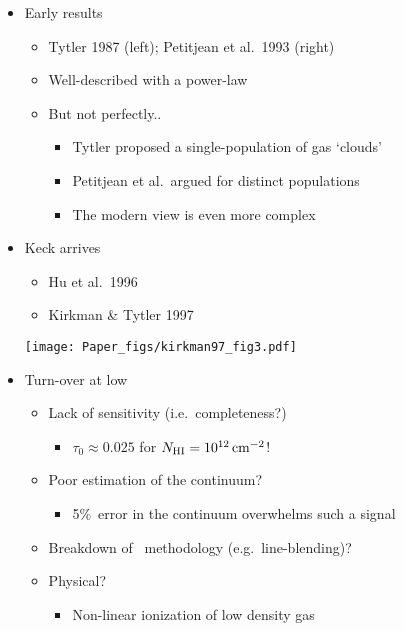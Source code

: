 \documentclass[12pt,letterpaper]{article}
\begin{document}
\begin{Aenumerate}
\begin{itemize}
\begin{itemize}
 	\item Early results
 		\begin{itemize}
 		\item Tytler 1987 (left); Petitjean et al.\ 1993 (right)
 		\item Well-described with a power-law
 		\item But not perfectly..
 			\begin{itemize}
 			\item Tytler proposed a single-population of gas `clouds'
 			\item Petitjean et al.\ argued for distinct populations
 			\item The modern view is even more complex
 			\end{itemize}
 		\end{itemize}
 	\item Keck arrives
 		\begin{itemize}
 		\item Hu et al.\ 1996
 		\item Kirkman \& Tytler 1997
 		\end{itemize}

	\texttt{[image: Paper\_figs/kirkman97\_fig3.pdf]}

 		\item Turn-over at low \nhi
 		\begin{itemize}
 		\item Lack of sensitivity (i.e.\ completeness?)
 			\begin{itemize}
 			\item $\tau_0 \approx 0.025$ for $N_{\rm HI} = 10^{12} \, {\rm cm^{-2}}$!
 			\end{itemize}
 		\item Poor estimation of the continuum?
 			\begin{itemize}
 			\item 5\%\ error in the continuum overwhelms such a signal
 			\end{itemize}
 		\item Breakdown of \fnhi\ methodology (e.g.\ line-blending)? 
 		\item Physical?
 			\begin{itemize}
 			\item Non-linear ionization of low density gas
 			\end{itemize}
 		\end{itemize}


\end{itemize}
\end{itemize}
\end{Aenumerate}
\end{document}

